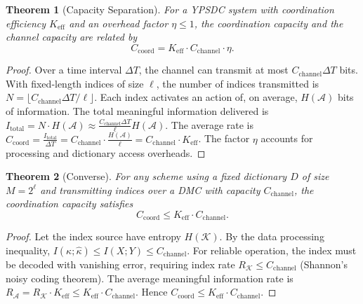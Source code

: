 \documentclass[12pt]{article}
\newtheorem{theorem}{Theorem}
\begin{document}
	\begin{theorem}[Capacity Separation]
		\label{thm:capacity-separation}
		For a YPSDC system with coordination efficiency \(K_{\mathrm{eff}}\) and an overhead factor \(\eta \le 1\), the coordination capacity and the channel capacity are related by
		\begin{equation}
			\boxed{C_{\mathrm{coord}} = K_{\mathrm{eff}} \cdot C_{\mathrm{channel}} \cdot \eta}.
			\label{eq:capacity-separation}
		\end{equation}
	\end{theorem}
	
	\begin{proof}
		Over a time interval \(\Delta T\), the channel can transmit at most \(C_{\mathrm{channel}} \Delta T\) bits. With fixed‑length indices of size \(\ell\), the number of indices transmitted is \(N = \lfloor C_{\mathrm{channel}} \Delta T / \ell \rfloor\). Each index activates an action of, on average, \(H(\mathcal{A})\) bits of information. The total meaningful information delivered is \(I_{\mathrm{total}} = N \cdot H(\mathcal{A}) \approx \frac{C_{\mathrm{channel}} \Delta T}{\ell} H(\mathcal{A})\). The average rate is \(C_{\mathrm{coord}} = \frac{I_{\mathrm{total}}}{\Delta T} = C_{\mathrm{channel}} \cdot \frac{H(\mathcal{A})}{\ell} = C_{\mathrm{channel}} \cdot K_{\mathrm{eff}}\). The factor \(\eta\) accounts for processing and dictionary access overheads.
	\end{proof}
	
	\begin{theorem}[Converse]
		For any scheme using a fixed dictionary \(D\) of size \(M = 2^\ell\) and transmitting indices over a DMC with capacity \(C_{\mathrm{channel}}\), the coordination capacity satisfies
		\[
		C_{\mathrm{coord}} \le K_{\mathrm{eff}} \cdot C_{\mathrm{channel}}.
		\]
	\end{theorem}
	
	\begin{proof}
		Let the index source have entropy \(H(\mathcal{K})\). By the data processing inequality, \(I(\kappa;\hat{\kappa}) \le I(X;Y) \le C_{\mathrm{channel}}\). For reliable operation, the index must be decoded with vanishing error, requiring index rate \(R_{\mathcal{K}} \le C_{\mathrm{channel}}\) (Shannon's noisy coding theorem). The average meaningful information rate is \(R_{\mathcal{A}} = R_{\mathcal{K}} \cdot K_{\mathrm{eff}} \le K_{\mathrm{eff}} \cdot C_{\mathrm{channel}}\). Hence \(C_{\mathrm{coord}} \le K_{\mathrm{eff}} \cdot C_{\mathrm{channel}}\).
	\end{proof}
	
\end{document}
